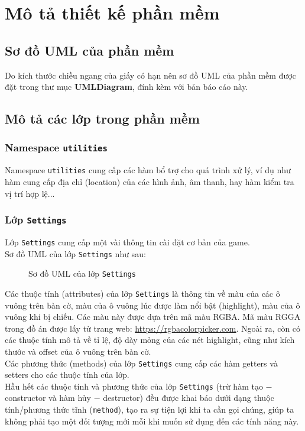 \section{Mô tả thiết kế phần mềm}
\subsection{Sơ đồ UML của phần mềm}
Do kích thước chiều ngang của giấy có hạn nên sơ đồ UML của phần mềm được đặt trong thư mục \textbf{UMLDiagram}, đính kèm với bản báo cáo này.

\subsection{Mô tả các lớp trong phần mềm}
\subsubsection{Namespace \lstinline{utilities}}
Namespace \lstinline{utilities} cung cấp các hàm bổ trợ cho quá trình xử lý, ví dụ như hàm cung cấp địa chỉ (location) của các hình ảnh, âm thanh, hay hàm kiểm tra vị trí hợp lệ...
\subsubsection{Lớp \lstinline{Settings}}
Lớp \lstinline{Settings} cung cấp một vài thông tin cài đặt cơ bản của game.\\
Sơ đồ UML của lớp \lstinline{Settings} như sau:
\begin{figure}[H]
\caption{Sơ đồ UML của lớp \lstinline{Settings}}
\end{figure} 
Các thuộc tính (attributes) của lớp \lstinline{Settings} là thông tin về màu của các ô vuông trên bàn cờ, màu của ô vuông lúc được làm nổi bật (highlight), màu của ô vuông khi bị chiếu. Các màu này được dựa trên mã màu RGBA. Mã màu RGGA trong đồ án được lấy từ trang web: \url{https://rgbacolorpicker.com}. Ngoài ra, còn có các thuộc tính mô tả về tỉ lệ, độ dày mỏng của các nét highlight, cũng như kích thước và offset của ô vuông trên bàn cờ.\\
Các phương thức (methods) của lớp \lstinline{Settings} cung cấp các hàm getters và setters cho các thuộc tính của lớp.\\
Hầu hết các thuộc tính và phương thức của lớp \lstinline{Settings} (trừ hàm tạo $-$ constructor và hàm hủy $-$ destructor) đều được khai báo dưới dạng thuộc tính/phương thức tĩnh (\lstinline{method}), tạo ra sự tiện lợi khi ta cần gọi chúng, giúp ta không phải tạo một đối tượng mới mỗi khi muốn sử dụng đến các tính năng này.
